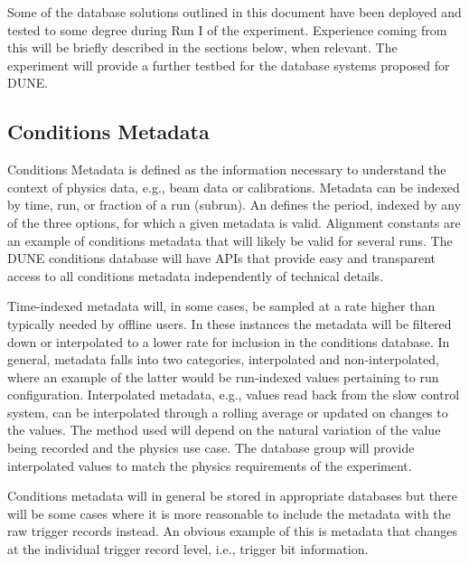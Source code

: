 \documentclass[../main-v1.tex]{subfiles}
\begin{document}
Some of the database solutions outlined in this document have been deployed and tested to some degree during Run I of the  experiment. Experience coming from %
this will be briefly described in the sections below, when relevant. %
The  experiment will provide a further testbed for the database systems proposed for DUNE.  

\subsection{Conditions Metadata}
\label{subsec:db:conditions_metadata} 

Conditions Metadata is defined as the information necessary to understand the context of physics data, e.g., beam data or calibrations.
Metadata can be indexed by %
time, run, or fraction of a run (subrun). 
An 
defines the period, indexed by any of the three options, for which a given metadata is valid.
Alignment constants are an example of conditions metadata that will likely be valid for several runs. 
The DUNE conditions database will have APIs that provide easy and transparent access to all conditions metadata independently of technical details.

Time-indexed metadata will, in some cases, be sampled at a rate higher than typically needed by offline users. In these instances the metadata will be filtered down or interpolated to a lower rate for inclusion in the conditions database. In general, metadata falls into two categories, interpolated and non-interpolated, where an example of the latter would be run-indexed values pertaining to run configuration. Interpolated metadata, e.g., values read back from the slow control system, can be interpolated through a rolling average or updated on changes to the values. The method used will depend on the natural variation of the value being recorded and the physics use case. 
The database group will provide interpolated values to match the physics requirements of the experiment.  

Conditions metadata will in general be stored in appropriate databases but there will be some cases where it is more reasonable to include the metadata with the raw trigger records instead. An obvious example of this is metadata that changes at the individual trigger record level, i.e., trigger bit information. 
\end{document}

